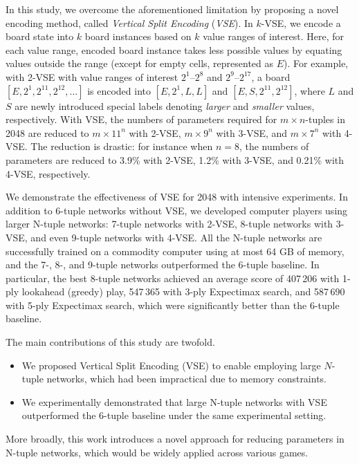 In this study, we overcome the aforementioned limitation by proposing a novel encoding method, called \emph{Vertical Split Encoding} (\emph{VSE}). In $k$-VSE, we encode a board state into $k$ board instances based on $k$ value ranges of interest. Here, for each value range, encoded board instance takes less possible values by equating values outside the range (except for empty cells, represented as $E$).
For example, with 2-VSE with value ranges of interest $2^1$--$2^8$ and $2^9$--$2^{17}$, a board $[E, 2^1, 2^{11}, 2^{12}, \ldots]$ is encoded into $[E, 2^1, L, L]$ and $[E, S, 2^{11}, 2^{12}]$, where $L$ and $S$ are newly introduced special labels denoting \emph{larger} and \emph{smaller} values, respectively.
With VSE, the numbers of parameters required for $m$\,$\times$\,$n$-tuples in 2048 are reduced to $m\times 11^n$ with 2-VSE, $m\times 9^n$ with 3-VSE, and $m\times 7^n$ with 4-VSE. The reduction is drastic: for instance when $n=8$, the numbers of parameters are reduced to 3.9\% with 2-VSE, 1.2\% with 3-VSE, and 0.21\% with 4-VSE, respectively.


We demonstrate the effectiveness of VSE for 2048 with intensive experiments.
In addition to 6-tuple networks without VSE, we developed computer players using larger N-tuple networks: 7-tuple networks with 2-VSE, 8-tuple networks with 3-VSE, and even 9-tuple networks with 4-VSE.
All the N-tuple networks are successfully trained on a commodity computer using at most 64 GB of memory, and the 7-, 8-, and 9-tuple networks outperformed the 6-tuple baseline.
In particular, the best 8-tuple networks achieved an average score of 407\,206 with 1-ply lookahead (greedy) play, 547\,365 with 3-ply Expectimax search, and 587\,690 with 5-ply Expectimax search, which were significantly better than the 6-tuple baseline.



The main contributions of this study are twofold.
\begin{itemize}
 \item We proposed Vertical Split Encoding (VSE) to enable employing large $N$-tuple networks, which had been impractical due to memory constraints.
 \item We experimentally demonstrated that large N-tuple networks with VSE outperformed the 6-tuple baseline under the same experimental setting.
\end{itemize}
More broadly, this work introduces a novel approach for reducing parameters in N-tuple networks, which would be widely applied across various games.

